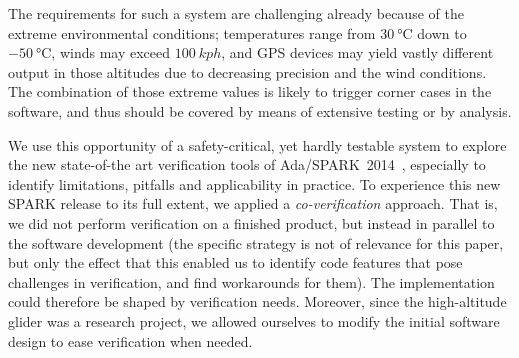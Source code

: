 

The requirements for such a system are challenging already because of the
extreme environmental conditions; temperatures range from $\SI{+30}{\celsius}$
down to $\SI{-50}{\celsius}$, winds may exceed $\SI{100}{kph}$, and GPS devices may
yield vastly different output in those altitudes due to decreasing precision and the
wind conditions. The combination of
those extreme values is likely to trigger corner cases %
in the software, and thus should be covered by means of extensive testing or
by analysis. 

 We use this opportunity of a safety-critical, yet hardly testable
 system to explore the new state-of-the art verification tools of
 Ada/SPARK~2014~\cite{GNATprove}, especially to identify limitations,
 pitfalls and applicability in practice.  To
 experience this new SPARK release to its full extent, we applied a
 \emph{co-verification} approach. That is, we did not perform
 verification on a finished product, but instead in parallel to the
 software development (the specific strategy is not of relevance for this paper, but only the effect that this enabled us to identify 
 code features that pose challenges in verification, and find workarounds for them). The implementation could therefore be shaped by
 verification needs. Moreover, since the high-altitude glider was a
 research project, we allowed ourselves to modify the initial
 software design to ease verification when needed.

